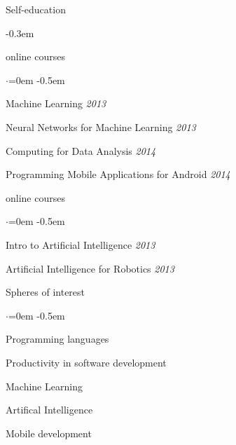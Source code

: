 \documentclass{resume} %
\begin{document}
\begin{rSection}{Self-education}

\begin{description} \itemsep -0.3em
  \item[Coursera] \hfill {online courses}
  \begin{list}{$\cdot$}{\leftmargin=0em} %
    \itemsep -0.5em \vspace{-0.5em} %
    \item Machine Learning \hfill {\em 2013}
    \item Neural Networks for Machine Learning \hfill {\em  2013}
    \item Computing for Data Analysis \hfill {\em  2014}
    \item Programming Mobile Applications for Android \hfill {\em  2014}
  \end{list}
  \item[Udacity] \hfill {online courses}
  \begin{list}{$\cdot$}{\leftmargin=0em} %
    \itemsep -0.5em \vspace{-0.5em} %
    \item Intro to Artificial Intelligence \hfill {\em  2013}
    \item Artificial Intelligence for Robotics \hfill {\em  2013}
  \end{list}
\end{description}

\end{rSection}


\begin{rSection}{Spheres of interest}
  \smallskip
  \begin{list}{$\cdot$}{\leftmargin=0em} %
    \itemsep -0.5em \vspace{-0.3em} %
  \item Programming languages
  \item Productivity in software development
  \item Machine Learning
  \item Artifical Intelligence
  \item Mobile development
  \end{list}
\end{rSection}
\end{document}
